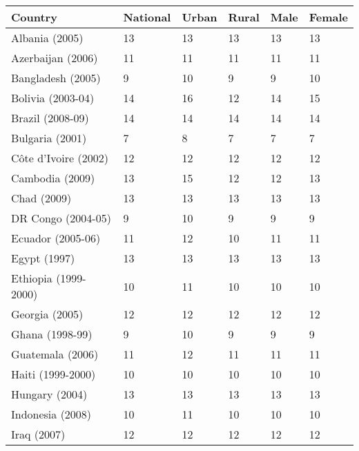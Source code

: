 \begin{multicols}{2}

}{}

\IfFileExists{./Plots/C.P1.HS.1.2.pdf}{\texttt{[image: \{./Plots/C.P1.HS.1.2]}.pdf}}{}
\end{multicols}
\clearpage

 \label{tab:title} 
      \begin{tabular}{L{2.0cm} R{0.7cm} R{0.7cm} R{0.7cm} R{0.7cm} R{0.7cm}}
      \toprule
      Country & National & Urban & Rural & Male & Female \\
      \midrule
        Albania (2005) & 13 & 13 & 13 & 13 & 13 \\
        Azerbaijan (2006) & 11 & 11 & 11 & 11 & 11 \\
        Bangladesh (2005) & 9 & 10 & 9 & 9 & 10 \\
        Bolivia (2003-04) & 14 & 16 & 12 & 14 & 15 \\
        Brazil (2008-09) & 14 & 14 & 14 & 14 & 14 \\
        Bulgaria (2001) & 7 & 8 & 7 & 7 & 7 \\
        C\^{o}te d'Ivoire (2002) & 12 & 12 & 12 & 12 & 12 \\
        Cambodia (2009) & 13 & 15 & 12 & 12 & 13 \\
        Chad (2009) & 13 & 13 & 13 & 13 & 13 \\
        DR Congo (2004-05) & 9 & 10 & 9 & 9 & 9 \\
        Ecuador (2005-06) & 11 & 12 & 10 & 11 & 11 \\
        Egypt (1997) & 13 & 13 & 13 & 13 & 13 \\
        Ethiopia (1999-2000) & 10 & 11 & 10 & 10 & 10 \\
        Georgia (2005) & 12 & 12 & 12 & 12 & 12 \\
        Ghana (1998-99) & 9 & 10 & 9 & 9 & 9 \\
        Guatemala (2006) & 11 & 12 & 11 & 11 & 11 \\
        Haiti (1999-2000) & 10 & 10 & 10 & 10 & 10 \\
        Hungary (2004) & 13 & 13 & 13 & 13 & 13 \\
        Indonesia (2008) & 10 & 11 & 10 & 10 & 10 \\
        Iraq (2007) & 12 & 12 & 12 & 12 & 12 \\

\end{tabular}
